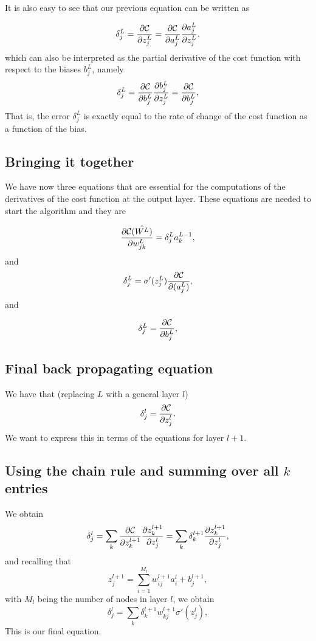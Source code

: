 \documentclass[%
oneside,                 %
final,                   %
10pt]{article}
\begin{document}
It is also easy to see that our previous equation can be written as

\[
\delta_j^L =\frac{\partial {\cal C}}{\partial z_j^L}= \frac{\partial {\cal C}}{\partial a_j^L}\frac{\partial a_j^L}{\partial z_j^L},
\]
which can also be interpreted as the partial derivative of the cost function with respect to the biases $b_j^L$, namely
\[
\delta_j^L = \frac{\partial {\cal C}}{\partial b_j^L}\frac{\partial b_j^L}{\partial z_j^L}=\frac{\partial {\cal C}}{\partial b_j^L},
\]
That is, the error $\delta_j^L$ is exactly equal to the rate of change of the cost function as a function of the bias. 

\subsection{Bringing it together}

We have now three equations that are essential for the computations of the derivatives of the cost function at the output layer. These equations are needed to start the algorithm and they are

\begin{equation}
\frac{\partial{\cal C}(\hat{W^L})}{\partial w_{jk}^L}  =  \delta_j^La_k^{L-1},
\end{equation}
and
\begin{equation}
\delta_j^L = \sigma'(z_j^L)\frac{\partial {\cal C}}{\partial (a_j^L)},
\end{equation}
and

\begin{equation}
\delta_j^L = \frac{\partial {\cal C}}{\partial b_j^L},
\end{equation}

\subsection{Final back propagating equation}

We have that (replacing $L$ with a general layer $l$)
\[
\delta_j^l =\frac{\partial {\cal C}}{\partial z_j^l}.
\]
We want to express this in terms of the equations for layer $l+1$.

\subsection{Using the chain rule and summing over all $k$ entries}

We obtain
\[
\delta_j^l =\sum_k \frac{\partial {\cal C}}{\partial z_k^{l+1}}\frac{\partial z_k^{l+1}}{\partial z_j^{l}}=\sum_k \delta_k^{l+1}\frac{\partial z_k^{l+1}}{\partial z_j^{l}},
\]
and recalling that
\[
z_j^{l+1} = \sum_{i=1}^{M_{l}}w_{ij}^{l+1}a_i^{l}+b_j^{l+1},
\]
with $M_l$ being the number of nodes in layer $l$, we obtain
\[
\delta_j^l =\sum_k \delta_k^{l+1}w_{kj}^{l+1}\sigma'(z_j^l),
\]
This is our final equation.
\end{document}
